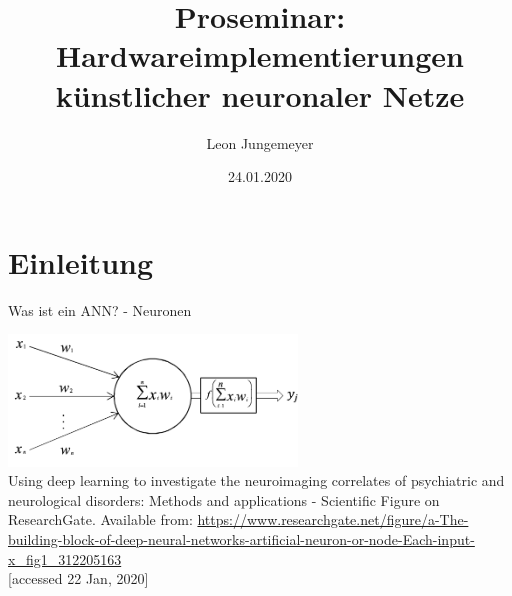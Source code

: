 \documentclass[handout]{beamer}
\title[Hardwareimplementierungen künstlicher neuronaler Netze]{Proseminar: Hardwareimplementierungen künstlicher neuronaler Netze}
\author{Leon Jungemeyer}
\date{24.01.2020}
\institute{Professur für Rechnerarchitektur und Parallelverarbeitung}
\begin{document}

    \begin{frame}
        \titlepage
    \end{frame}

    \section{Einleitung}

    \begin{frame} {Was ist ein ANN? - Neuronen}
        \begin{center}
            \includegraphics[width=290px]{resources/ann-neuron.png} \\
            \tiny Using deep learning to investigate the neuroimaging correlates of psychiatric and neurological disorders: Methods and applications - Scientific Figure on ResearchGate.
            \tiny Available from: \href{https://www.researchgate.net/figure/a-The-building-block-of-deep-neural-networks-artificial-neuron-or-node-Each-input-x\_fig1\_312205163}{https://www.researchgate.net/figure/a-The-building-block-of-deep-neural-networks-artificial-neuron-or-node-Each-input-x\_fig1\_312205163} \\
            \tiny [accessed 22 Jan, 2020]
        \end{center}
    \end{frame}
\end{document}
